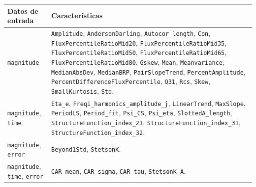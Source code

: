 \begin{table}[!ht]
    \centering
    \begin{tabular}{||p{4cm}|p{7cm}||}
        \hline

         Datos de entrada
         &
         Características
         \\

        \hline
        \hline

        \texttt{magnitude}
        & 
        \texttt{Amplitude},
        \texttt{AndersonDarling},
        \texttt{Autocor\_length},
        \texttt{Con},
        \texttt{FluxPercentileRatioMid20},
        \texttt{FluxPercentileRatioMid35},
        \texttt{FluxPercentileRatioMid50},
        \texttt{FluxPercentileRatioMid65},
        \texttt{FluxPercentileRatioMid80},
        \texttt{Gskew},
        \texttt{Mean},
        \texttt{Meanvariance},
        \texttt{MedianAbsDev},
        \texttt{MedianBRP},
        \texttt{PairSlopeTrend},
        \texttt{PercentAmplitude},
        \texttt{PercentDifferenceFluxPercentile},
        \texttt{Q31},
        \texttt{Rcs},
        \texttt{Skew},
        \texttt{SmallKurtosis},
        \texttt{Std}.
        \\

        \hline

        \texttt{magnitude}, 
        \texttt{time}
        &
        \texttt{Eta\_e},
        \texttt{Freq{i}\_harmonics\_amplitude\_{j}},
        \texttt{LinearTrend},
        \texttt{MaxSlope},
        \texttt{PeriodLS},
        \texttt{Period\_fit},
        \texttt{Psi\_CS},
        \texttt{Psi\_eta},
        \texttt{SlottedA\_length},
        \texttt{StructureFunction\_index\_21},
        \texttt{StructureFunction\_index\_31},
        \texttt{StructureFunction\_index\_32}.
        \\
        
        \hline
        
        \texttt{magnitude}, 
        \texttt{error}
        &
        \texttt{Beyond1Std},
        \texttt{StetsonK}.
        \\
        
        \hline
        
        \texttt{magnitude}, 
        \texttt{time},
        \texttt{error}
        &
        \texttt{CAR\_mean},
        \texttt{CAR\_sigma},
        \texttt{CAR\_tau},
        \texttt{StetsonK\_A}.
        \\
        
        \hline
        

\end{tabular}
\end{table}
